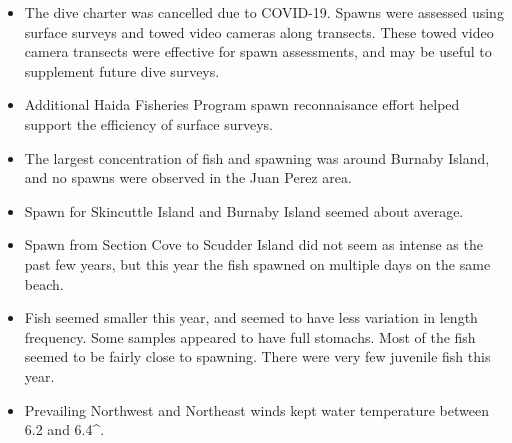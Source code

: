 \begin{itemize}

\item The dive charter was cancelled due to COVID-19.
Spawns were assessed using surface surveys and towed video cameras along transects.
These towed video camera transects were effective for spawn assessments, and may be useful to supplement future dive surveys.

\item Additional Haida Fisheries Program spawn reconnaisance effort helped support the efficiency of surface surveys.

\item The largest concentration of fish and spawning was around Burnaby Island, and no spawns were observed in the Juan Perez area.

\item Spawn for Skincuttle Island and Burnaby Island seemed about average. 

\item Spawn from Section Cove to Scudder Island did not seem as intense as the past few years, but this year the fish spawned on multiple days on the same beach.

\item Fish seemed smaller this year, and seemed to have less variation in length frequency.
Some samples appeared to have full stomachs.
Most of the fish seemed to be fairly close to spawning.
There were very few juvenile fish this year.

\item Prevailing Northwest and Northeast winds kept water temperature between 6.2 and 6.4^\circ{}.

\end{itemize}